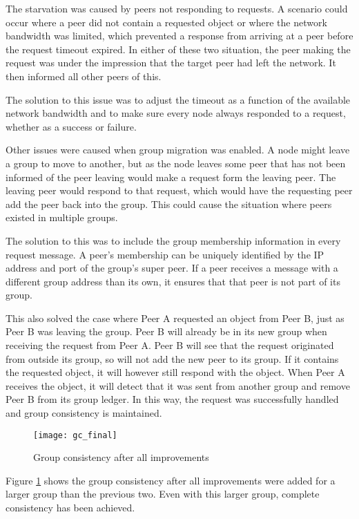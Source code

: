The starvation was caused by peers not responding to requests. A scenario could occur where a peer did not contain a requested object or where the network bandwidth was limited, which prevented a response from arriving at a peer before the request timeout expired. In either of these two situation, the peer making the request was under the impression that the target peer had left the network. It then informed all other peers of this.

The solution to this issue was to adjust the timeout as a function of the available network bandwidth and to make sure every node always responded to a request, whether as a success or failure.

Other issues were caused when group migration was enabled. A node might leave a group to move to another, but as the node leaves some peer that has not been informed of the peer leaving would make a request form the leaving peer. The leaving peer would respond to that request, which would have the requesting peer add the peer back into the group. This could cause the situation where peers existed in multiple groups.

The solution to this was to include the group membership information in every request message. A peer's membership can be uniquely identified by the IP address and port of the group's super peer. If a peer receives a message with a different group address than its own, it ensures that that peer is not part of its group.

This also solved the case where Peer A requested an object from Peer B, just as Peer B was leaving the group. Peer B will already be in its new group when receiving the request from Peer A. Peer B will see that the request originated from outside its group, so will not add the new peer to its group. If it contains the requested object, it will however still respond with the object. When Peer A receives the object, it will detect that it was sent from another group and remove Peer B from its group ledger. In this way, the request was successfully handled and group consistency is maintained.

\begin{figure}[htbp]
 \centering
 \texttt{[image: gc\_final]}
 \caption{Group consistency after all improvements}
 \label{fig_gc_final}
\end{figure}

Figure \ref{fig_gc_final} shows the group consistency after all improvements were added for a larger group than the previous two. Even with this larger group, complete consistency has been achieved.

